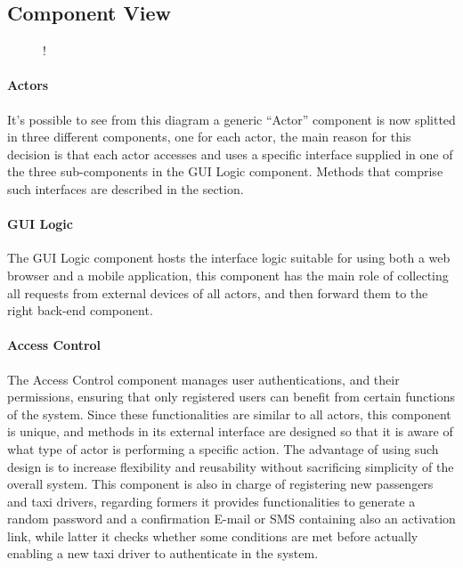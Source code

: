 \subsection{Component View}
\label{sec:component-view}
\begin{figure}[H]
	\centering
	\resizebox{6in}
	{!}{}
\end{figure}
\paragraph{Actors}
It's possible to see from this diagram a generic ``Actor'' component is now splitted in three different components, one for each actor, the main reason for this decision is that each actor accesses and uses a specific interface supplied in one of the three sub-components in the GUI Logic component. Methods that comprise such interfaces are described in the  section.
\paragraph{GUI Logic}
The GUI Logic component hosts the interface logic suitable for using both a web browser and a mobile application, this component has the main role of collecting all requests from external devices of all actors, and then forward them to the right back-end component.
\paragraph{Access Control}
The Access Control component manages user authentications, and their permissions, ensuring that only registered users can benefit from certain functions of the system. \newline Since these functionalities are similar to all actors, this component is unique, and methods in its external interface are designed so that it is aware of what type of actor is performing a specific action. The advantage of using such design is to increase flexibility and reusability without sacrificing simplicity of the overall system. \newline
This component is also in charge of registering new passengers and taxi drivers, regarding formers it provides functionalities to generate a random password and a confirmation E-mail or SMS containing also an activation link, while latter it checks whether some conditions are met before actually enabling a new taxi driver to authenticate in the system. 
